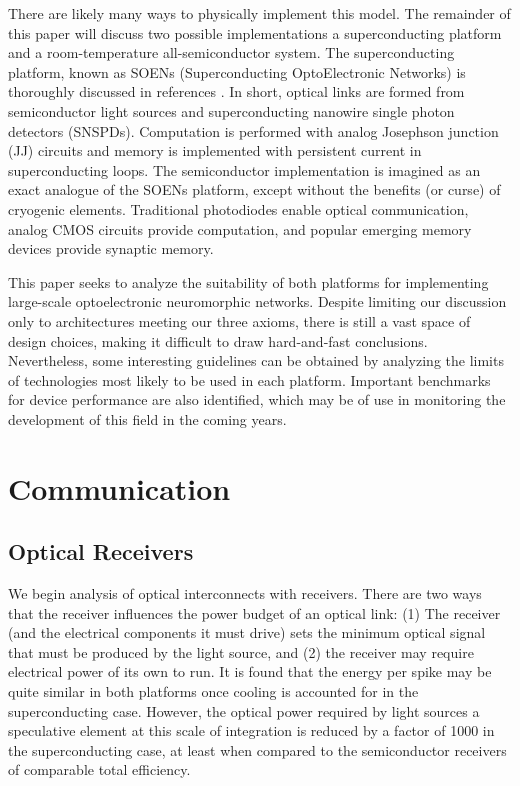 \documentclass[twocolumn]{article}
\begin{document}
There are likely many ways to physically implement this model. The remainder of this paper will discuss two possible implementations \textemdash a superconducting platform and a room-temperature all-semiconductor system. The superconducting platform, known as SOENs (Superconducting OptoElectronic Networks) is thoroughly discussed in references \cite{shainline2017superconducting, shainline2019superconducting, shainline2019fluxonic}. In short, optical links are formed from semiconductor light sources and superconducting nanowire single photon detectors (SNSPDs). Computation is performed with analog Josephson junction (JJ) circuits and memory is implemented with persistent current in superconducting loops. The semiconductor implementation is imagined as an exact analogue of the SOENs platform, except without the benefits (or curse) of cryogenic elements. Traditional photodiodes enable optical communication, analog CMOS circuits provide computation, and popular emerging memory devices provide synaptic memory.

This paper seeks to analyze the suitability of both platforms for implementing large-scale optoelectronic neuromorphic networks. Despite limiting our discussion only to architectures meeting our three axioms, there is still a vast space of design choices, making it difficult to draw hard-and-fast conclusions. Nevertheless, some interesting guidelines can be obtained by analyzing the limits of technologies most likely to be used in each platform. Important benchmarks for device performance are also identified, which may be of use in monitoring the development of this field in the coming years.

\section{\label{sec:communication}Communication}
\subsection{Optical Receivers}
We begin analysis of optical interconnects with receivers. There are two ways that the receiver influences the power budget of an optical link: (1) The receiver (and the electrical components it must drive) sets the minimum optical signal that must be produced by the light source, and (2) the receiver may require electrical power of its own to run. It is found that the energy per spike may be quite similar in both platforms once cooling is accounted for in the superconducting case. However, the optical power required by light sources \textemdash a speculative element at this scale of integration \textemdash is reduced by a factor of 1000 in the superconducting case, at least when compared to the semiconductor receivers of comparable total efficiency.
\end{document}
